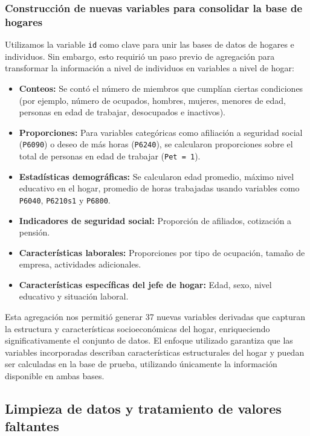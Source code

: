 \documentclass[12pt,a4paper,onecolumn]{article}
\begin{document}
\subsubsection{Construcción de nuevas variables para consolidar la base de hogares}

Utilizamos la variable \texttt{id} como clave para unir las bases de datos de hogares e individuos. Sin embargo, esto requirió un paso previo de agregación para transformar la información a nivel de individuos en variables a nivel de hogar:

\begin{itemize}
    \item \textbf{Conteos:} Se contó el número de miembros que cumplían ciertas condiciones (por ejemplo, número de ocupados, hombres, mujeres, menores de edad, personas en edad de trabajar, desocupados e inactivos).
    \item \textbf{Proporciones:} Para variables categóricas como afiliación a seguridad social (\texttt{P6090}) o deseo de más horas (\texttt{P6240}), se calcularon proporciones sobre el total de personas en edad de trabajar (\texttt{Pet = 1}).
    \item \textbf{Estadísticas demográficas:} Se calcularon edad promedio, máximo nivel educativo en el hogar, promedio de horas trabajadas usando variables como \texttt{P6040}, \texttt{P6210s1} y \texttt{P6800}.
    \item \textbf{Indicadores de seguridad social:} Proporción de afiliados, cotización a pensión.
    \item \textbf{Características laborales:} Proporciones por tipo de ocupación, tamaño de empresa, actividades adicionales.
    \item \textbf{Características específicas del jefe de hogar:} Edad, sexo, nivel educativo y situación laboral.
\end{itemize}

Esta agregación nos permitió generar 37 nuevas variables derivadas que capturan la estructura y características socioeconómicas del hogar, enriqueciendo significativamente el conjunto de datos. El enfoque utilizado garantiza que las variables incorporadas describan características estructurales del hogar y puedan ser calculadas en la base de prueba, utilizando únicamente la información disponible en ambas bases.

\subsection{Limpieza de datos y tratamiento de valores faltantes}
\end{document}
